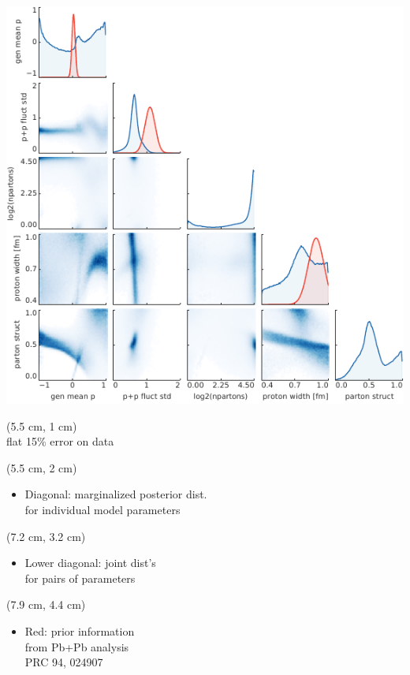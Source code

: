 \documentclass[aspectratio=43]{beamer}
\theoremstyle{definition}
\begin{document}
\begin{frame}[plain]
  \centering
  \includegraphics[width=.95\textheight]{posterior_jonah}
  \begin{textblock*}{0.6\paperwidth}(5.5 cm, 1 cm)
    {\Large \color{theme}{Posterior distribution}} \\
    \small flat 15\% error on data \\
  \end{textblock*}
  \begin{textblock*}{0.6\paperwidth}(5.5 cm, 2 cm)
    \begin{itemize}
      \item Diagonal: marginalized posterior dist.\\for individual model parameters
    \end{itemize}
  \end{textblock*}
  \begin{textblock*}{0.6\paperwidth}(7.2 cm, 3.2 cm)
    \begin{itemize}
      \item Lower diagonal: joint dist's\\for pairs of parameters
    \end{itemize}
  \end{textblock*}
  \begin{textblock*}{0.6\paperwidth}(7.9 cm, 4.4 cm)
    \begin{itemize}
      \item Red: prior information\\
        from Pb+Pb analysis \\[.3em]
            \hspace{1.5 cm} \scriptsize PRC 94, 024907
    \end{itemize}
  \end{textblock*}
\end{frame}
\end{document}
